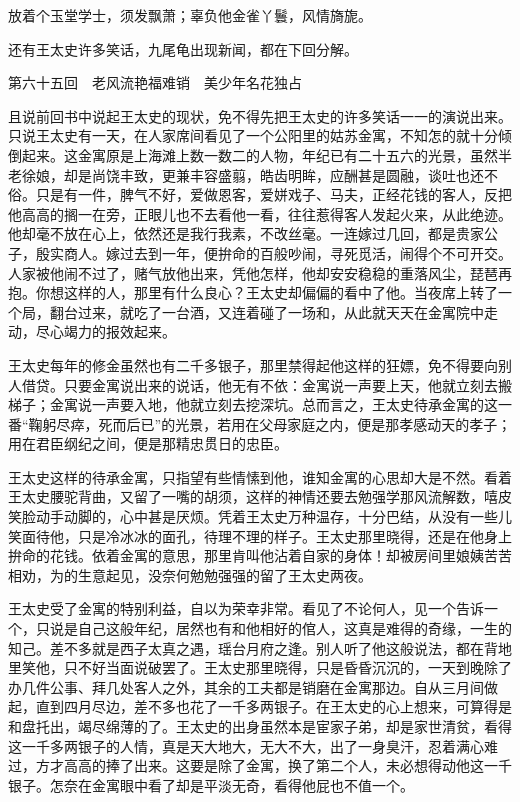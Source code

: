 \documentclass[12pt,UTF8]{ctexbook}
\begin{document}
{{{放着个玉堂学士，须发飘萧；辜负他金雀丫鬟，风情旖旎。

还有王太史许多笑话，九尾龟出现新闻，都在下回分解。





第六十五回　老风流艳福难销　美少年名花独占





且说前回书中说起王太史的现状，免不得先把王太史的许多笑话一一的演说出来。只说王太史有一天，在人家席间看见了一个公阳里的姑苏金寓，不知怎的就十分倾倒起来。这金寓原是上海滩上数一数二的人物，年纪已有二十五六的光景，虽然半老徐娘，却是尚饶丰致，更兼丰容盛翦，皓齿明眸，应酬甚是圆融，谈吐也还不俗。只是有一件，脾气不好，爱做恩客，爱姘戏子、马夫，正经花钱的客人，反把他高高的搁一在旁，正眼儿也不去看他一看，往往惹得客人发起火来，从此绝迹。他却毫不放在心上，依然还是我行我素，不改丝毫。一连嫁过几回，都是贵家公子，殷实商人。嫁过去到一年，便拚命的百般吵闹，寻死觅活，闹得个不可开交。人家被他闹不过了，赌气放他出来，凭他怎样，他却安安稳稳的重落风尘，琵琶再抱。你想这样的人，那里有什么良心？王太史却偏偏的看中了他。当夜席上转了一个局，翻台过来，就吃了一台酒，又连着碰了一场和，从此就天天在金寓院中走动，尽心竭力的报效起来。

王太史每年的修金虽然也有二千多银子，那里禁得起他这样的狂嫖，免不得要向别人借贷。只要金寓说出来的说话，他无有不依：金寓说一声要上天，他就立刻去搬梯子；金寓说一声要入地，他就立刻去挖深坑。总而言之，王太史待承金寓的这一番“鞠躬尽瘁，死而后已”的光景，若用在父母家庭之内，便是那孝感动天的孝子；用在君臣纲纪之间，便是那精忠贯日的忠臣。

王太史这样的待承金寓，只指望有些情愫到他，谁知金寓的心思却大是不然。看着王太史腰驼背曲，又留了一嘴的胡须，这样的神情还要去勉强学那风流解数，嘻皮笑脸动手动脚的，心中甚是厌烦。凭着王太史万种温存，十分巴结，从没有一些儿笑面待他，只是冷冰冰的面孔，待理不理的样子。王太史那里晓得，还是在他身上拚命的花钱。依着金寓的意思，那里肯叫他沾着自家的身体！却被房间里娘姨苦苦相劝，为的生意起见，没奈何勉勉强强的留了王太史两夜。

王太史受了金寓的特别利益，自以为荣幸非常。看见了不论何人，见一个告诉一个，只说是自己这般年纪，居然也有和他相好的倌人，这真是难得的奇缘，一生的知己。差不多就是西子太真之遇，瑶台月府之逢。别人听了他这般说法，都在背地里笑他，只不好当面说破罢了。王太史那里晓得，只是昏昏沉沉的，一天到晚除了办几件公事、拜几处客人之外，其余的工夫都是销磨在金寓那边。自从三月间做起，直到四月尽边，差不多也花了一千多两银子。在王太史的心上想来，可算得是和盘托出，竭尽绵薄的了。王太史的出身虽然本是宦家子弟，却是家世清贫，看得这一千多两银子的人情，真是天大地大，无大不大，出了一身臭汗，忍着满心难过，方才高高的捧了出来。这要是除了金寓，换了第二个人，未必想得动他这一千银子。怎奈在金寓眼中看了却是平淡无奇，看得他屁也不值一个。

}}}
\end{document}

